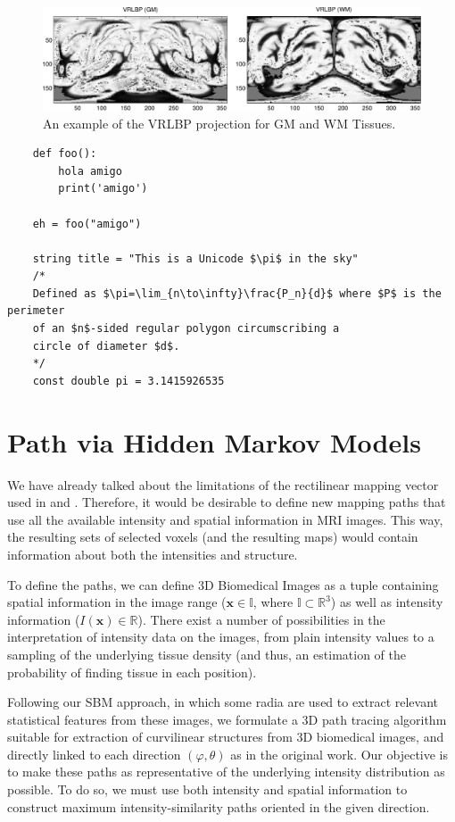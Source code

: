 \begin{figure}[htp]
	\centering
	\includegraphics[width=\textwidth]{Graphics/ch6/04-vrlbp}
	\caption{An example of the VRLBP projection for \ac{GM} and \ac{WM} Tissues. }
	\label{fig:vrlbp}
\end{figure}


\lstset{language=python} 
\begin{lstlisting}
	def foo():
		hola amigo
		print('amigo')
	
	eh = foo("amigo")
	
	string title = "This is a Unicode $\pi$ in the sky"
	/*
	Defined as $\pi=\lim_{n\to\infty}\frac{P_n}{d}$ where $P$ is the perimeter
	of an $n$-sided regular polygon circumscribing a
	circle of diameter $d$.
	*/
	const double pi = 3.1415926535
\end{lstlisting}

\section{Path via Hidden Markov Models}
We have already talked about the limitations of the rectilinear mapping vector used in \cite{Martinez-Murcia2015} and \cite{Martinez-MurciaVRLBP}. Therefore, it would be desirable to define new mapping paths that use all the available intensity and spatial information in MRI images. This way, the resulting sets of selected voxels (and the resulting maps) would contain information about both the intensities and structure.

To define the paths, we can define 3D Biomedical Images as a tuple containing spatial information in the image range ($\mathbf{x} \in \mathbb{I}$, where $\mathbb{I}\subset \mathbb{R}^3$) as well as intensity information ($I(\mathbf{x}) \in \mathbb{R}$). There exist a number of possibilities in the interpretation of intensity data on the images, from plain intensity values to a sampling of the underlying tissue density (and thus, an estimation of the probability of finding tissue in each position). 

Following our \ac{SBM} approach, in which some radia are used to extract relevant statistical features from these images, we formulate a 3D path tracing algorithm suitable for extraction of curvilinear structures from 3D biomedical images, and directly linked to each direction $(\varphi,\theta)$ as in the original work. Our objective is to make these paths as representative of the underlying intensity distribution as possible. To do so, we must use both intensity and spatial information to construct maximum intensity-similarity paths oriented in the given direction. 

